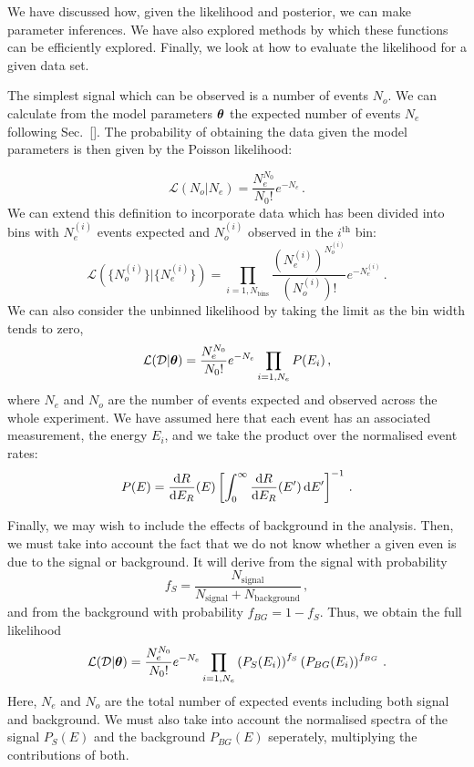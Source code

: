 We have discussed how, given the likelihood and posterior, we can make parameter inferences. We have also explored methods by which these functions can be efficiently explored. Finally, we look at how to evaluate the likelihood for a given data set. 

The simplest signal which can be observed is a number of events $N_o$. We can calculate from the model parameters $\boldsymbol\theta$ the expected number of events $N_e$ following Sec.~\ref{}. The probability of obtaining the data given the model parameters is then given by the Poisson likelihood:

\begin{equation}
\mathcal{L}(N_o|N_e) = \frac{N_e^{N_0}}{N_0!}e^{-N_e}\,.
\end{equation}
We can extend this definition to incorporate data which has been divided into bins with $N_e^{(i)}$ events expected and $N_o^{(i)}$ observed in the $i^\textrm{th}$ bin:
\begin{equation}
\label{eq:ParamRecon:binnedL}
\mathcal{L}(\{N_o^{(i)}\}|\{N_e^{(i)}\}) = \prod_{i = 1,N_\textrm{bins}} \frac{(N_e^{(i)})^{N_o^{(i)}}}{(N_o^{(i)})!}e^{-N_e^{(i)}}\,.
\end{equation}
We can also consider the unbinned likelihood by taking the limit as the bin width tends to zero,
\begin{equation}
\label{eq:ParamRecon:unbinnedL}
\mathcal{L}(\mathcal{D}|\boldsymbol\theta) = \frac{N_e^{N_0}}{N_0!}e^{-N_e}\prod_{i = 1,N_e} P(E_i)\,,
\end{equation}
where $N_e$ and $N_o$ are the number of events expected and observed across the whole experiment. We have assumed here that each event has an associated measurement, the energy $E_i$, and we take the product over the normalised event rates:
\begin{equation}
P(E) = \frac{\mathrm{d}R}{\mathrm{d}E_R}(E)\left[\int_0^{\infty} \frac{\mathrm{d}R}{\mathrm{d}E_R}(E')\,\mathrm{d}E'\right]^{-1}\,.
\end{equation}

Finally, we may wish to include the effects of background in the analysis. Then, we must take into account the fact that we do not know whether a given even is due to the signal or background. It will derive from the signal with probability
\begin{equation}
f_S = \frac{N_\textrm{signal}}{N_\textrm{signal} + N_\textrm{background}}\,,
\end{equation}
and from the background with probability $f_{BG} = 1-f_S$. Thus, we obtain the full likelihood
\begin{equation}
\mathcal{L}(\mathcal{D}|\boldsymbol\theta) = \frac{N_e^{N_0}}{N_0!}e^{-N_e}\prod_{i = 1,N_e} \left(P_S(E_i)\right)^{f_S}  \left(P_{BG}(E_i)\right)^{f_{BG}} \,.
\end{equation}
Here, $N_e$ and $N_o$ are the total number of expected events including both signal and background. We must also take into account the normalised spectra of the signal $P_S(E)$ and the background $P_{BG}(E)$ seperately, multiplying the contributions of both.


